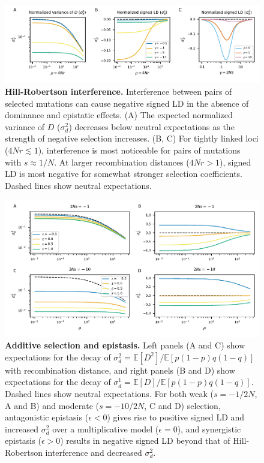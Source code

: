 \documentclass[]{article}
\newcommand{\E}{\mathbb{E}}
\begin{document}
\begin{figure}[tb!]
    \centering
    \includegraphics{../figures/hill_robertson}
    \caption{
        \textbf{Hill-Robertson interference.}
        Interference between pairs of selected mutations can cause negative
        signed LD in the absence of dominance and epistatic effects.
        (A) The expected normalized variance of $D$ (\(\sigma_d^2\))
        decreases below neutral expectations
        as the strength of negative selection increases.
        (B, C) For tightly linked loci (\(4Nr \lesssim 1\)), interference is most
        noticeable for pairs of mutations with \(s \approx 1/N\).
        At larger recombination distances (\(4Nr > 1\)), signed LD is most
        negative for somewhat stronger selection coefficients.
        Dashed lines show neutral expectations.
    }
    \label{fig:HillRobertson}
\end{figure}

\begin{figure}[tb!]
    \centering
    \includegraphics{../figures/epistasis_prediction}
    \caption{
        \textbf{Additive selection and epistasis.}
        Left panels (A and C) show expectations for the decay of
        \(\sigma_d^2 = \E[D^2] / \E[p(1-p)q(1-q)]\) with recombination
        distance, and right panels (B and D) show expectations for the
        decay of \(\sigma_d^1 = \E[D] / \E[p(1-p)q(1-q)]\). Dashed lines
        show neutral expectations.
        For both weak (\(s=-1/2N\), A and B) and moderate
        (\(s=-10/2N\), C and D) selection,
        antagonistic epistasis (\(\epsilon < 0\))
        gives rise to positive signed LD and increased $\sigma_d^2$ over
        a multiplicative model (\(\epsilon = 0\)),
        and synergistic epistasis (\(\epsilon > 0\)) results in negative signed
        LD beyond that of Hill-Robertson interference and decreased \(\sigma_d^2\).
    }
    \label{fig:epistasis}
\end{figure}
\end{document}
